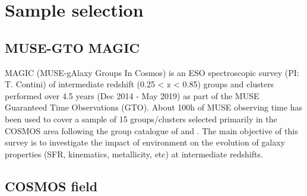 \clearpage
\section{Sample selection}
\label{sec:Sample_selection}

\subsection{MUSE-GTO MAGIC}

MAGIC (MUSE-gAlaxy Groups In Cosmos) is  an ESO spectroscopic survey (PI: T. Contini) of intermediate redshift (0.25 < z <  0.85) groups and clusters performed over 4.5 years (Dec 2014 - May 2019) as part of the MUSE Guaranteed Time Observations (GTO). About 100h of MUSE observing time has been used to cover a sample of 15 groups/clusters selected primarily in the COSMOS area following the group catalogue of  and . The main objective of this survey is to investigate the impact of environment on the evolution of galaxy properties (SFR, kinematics, metallicity, etc) at intermediate redshifts. 

\subsection{COSMOS field}

